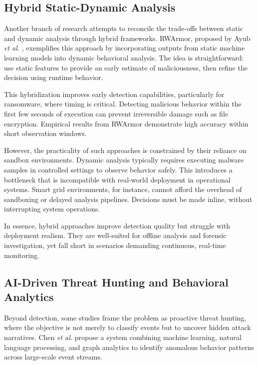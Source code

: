 \documentclass[conference]{IEEEtran}
\begin{document}
\subsection{Hybrid Static-Dynamic Analysis}

Another branch of research attempts to reconcile the trade-offs between static and dynamic analysis through hybrid frameworks. RWArmor, proposed by Ayub \textit{et al.} \cite{ayub2023}, exemplifies this approach by incorporating outputs from static machine learning models into dynamic behavioral analysis. The idea is straightforward: use static features to provide an early estimate of maliciousness, then refine the decision using runtime behavior.

This hybridization improves early detection capabilities, particularly for ransomware, where timing is critical. Detecting malicious behavior within the first few seconds of execution can prevent irreversible damage such as file encryption. Empirical results from RWArmor demonstrate high accuracy within short observation windows.

However, the practicality of such approaches is constrained by their reliance on sandbox environments. Dynamic analysis typically requires executing malware samples in controlled settings to observe behavior safely. This introduces a bottleneck that is incompatible with real-world deployment in operational systems. Smart grid environments, for instance, cannot afford the overhead of sandboxing or delayed analysis pipelines. Decisions must be made inline, without interrupting system operations.

In essence, hybrid approaches improve detection quality but struggle with deployment realism. They are well-suited for offline analysis and forensic investigation, yet fall short in scenarios demanding continuous, real-time monitoring.

\subsection{AI-Driven Threat Hunting and Behavioral Analytics}

Beyond detection, some studies frame the problem as proactive threat hunting, where the objective is not merely to classify events but to uncover hidden attack narratives. Chen \textit{et al.} \cite{chen2022} propose a system combining machine learning, natural language processing, and graph analytics to identify anomalous behavior patterns across large-scale event streams.
\end{document}
